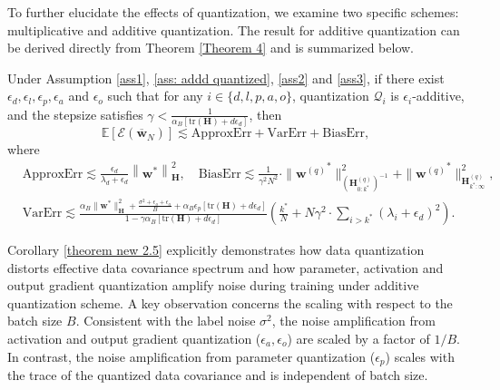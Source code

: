 \documentclass[11pt, letterpaper]{article}
\begin{document}
To further elucidate the effects of quantization, we examine two specific schemes: multiplicative and additive quantization. The result for additive quantization can be derived directly from Theorem \ref{Theorem 4} and is summarized below.
\begin{corollary}
    \label{theorem new 2.5}
    Under Assumption \ref{ass1}, \ref{ass: addd quantized}, \ref{ass2} and \ref{ass3}, if there exist $\epsilon_d,\epsilon_l,\epsilon_p,\epsilon_a$ and $\epsilon_o$ such that for any $i\in \{d,l,p,a,o\}$, quantization $\mathcal{Q}_i$ is $\epsilon_i$-additive, and the stepsize satisfies $\gamma < \frac{1}{\alpha_B [\mathrm{tr}(\mathbf{H})+d\epsilon_d]}$, then
    \begin{equation*}
        \mathbb{E}[\mathcal{E}(\overline{\mathbf{w}}_N)] \lesssim \mathrm{ApproxErr}+\mathrm{ VarErr}+\mathrm{BiasErr},
    \end{equation*}
    where
    \begin{align*}
            &\mathrm{ApproxErr}\lesssim \frac{\epsilon_d}{\lambda_d+\epsilon_d}\left\|\mathbf{w}^*\right\|_\mathbf{H}^2,\quad \mathrm{BiasErr}\lesssim\frac{1}{\gamma^2N^2}\cdot\|{\mathbf{w}^{(q)}}^*\|_{(\mathbf{H}_{0:k^*}^{(q)})^{-1}}^2+\|{\mathbf{w}^{(q)}}^*\|_{\mathbf{H}_{k^*:\infty}^{(q)}}^2,\\
            &\mathrm{VarErr}\lesssim \frac{\alpha_B\|\mathbf{w}^*\|_\mathbf{H}^2+\frac{\sigma^2+\epsilon_o+\epsilon_a}{B}+\alpha_B \epsilon_p[\mathrm{tr}(\mathbf{H})+d\epsilon_d]}{1-\gamma\alpha_B[\mathrm{tr}(\mathbf{H})+d\epsilon_d]}\left(\frac{k^*}{N}+N\gamma^2\cdot\sum_{i>k^*}(\lambda_i+\epsilon_d)^2\right).
    \end{align*}
\end{corollary}

Corollary \ref{theorem new 2.5} explicitly demonstrates how data quantization distorts effective data covariance spectrum and how parameter, activation and output gradient quantization amplify noise during training under additive quantization scheme. A key observation concerns the scaling with respect to the batch size $B$. Consistent with the label noise $\sigma^2$, the noise amplification from activation and output gradient quantization ($\epsilon_a, \epsilon_o$) are scaled by a factor of $1/B$. In contrast, the noise amplification from parameter quantization ($\epsilon_p$) scales with the trace of the quantized data covariance and is independent of batch size.
\end{document}
